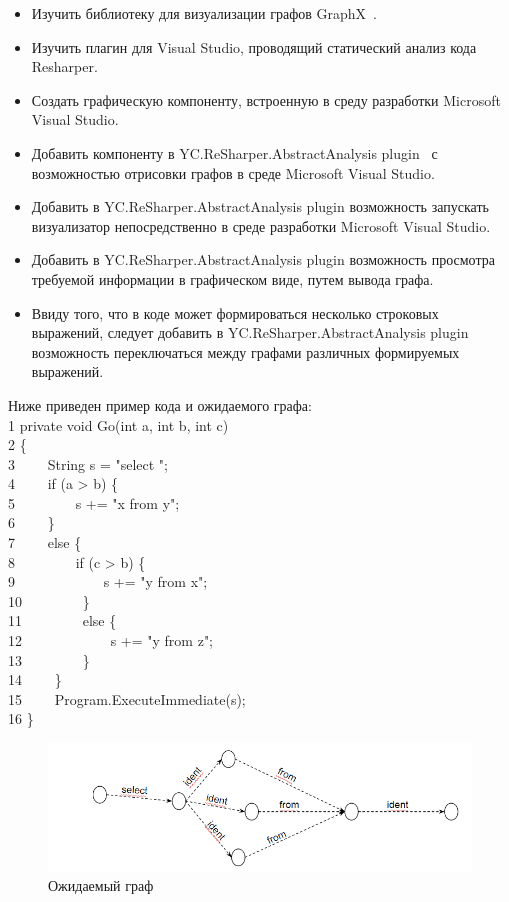 \documentclass{matmex-diploma}
\begin{document}
\begin{itemize}

         \item { Изучить библиотеку для визуализации графов GraphX~\cite{wiki:GraphX}.}
        \item { Изучить плагин для Visual Studio, проводящий статический анализ кода Resharper. }
       \item { Создать графическую компоненту, встроенную в среду разработки Microsoft Visual Studio. }
        \item {Добавить компоненту в YC.ReSharper.AbstractAnalysis plugin~\cite{wiki:Plugin} с возможностью отрисовки графов в среде Microsoft Visual Studio.}
        \item{ Добавить в YC.ReSharper.AbstractAnalysis plugin возможность запускать визуализатор непосредственно в среде разработки Microsoft Visual Studio. }
        \item{ Добавить в YC.ReSharper.AbstractAnalysis plugin возможность просмотра требуемой информации в графическом виде, путем вывода графа. }
        \item { Ввиду того, что в коде может формироваться несколько строковых выражений, следует добавить в YC.ReSharper.AbstractAnalysis plugin возможность переключаться между графами различных формируемых выражений. }
 \end{itemize}
Ниже приведен пример кода и ожидаемого графа:\\
1 private void Go(int a, int b, int c)\\
2 \{\\
3 \ \ \ \ String s = "select ";\\
4 \ \ \ \ if (a > b) \{\\
5 \ \ \ \ \ \ \ \ s += "x from y";\\
6 \ \ \ \ \}\\
7 \ \ \ \ else \{\\
8 \ \ \ \ \ \ \ \ if (c > b) \{\\
9 \ \ \ \ \ \ \ \ \ \ \ \ s += "y from x";\\
10 \ \ \ \ \ \ \ \ \}\\
11 \ \ \ \ \ \ \ \ else \{\\
12 \ \ \ \ \ \ \ \ \ \ \ \ s += "y from z";\\
13 \ \ \ \ \ \ \ \ \}\\
14 \ \ \ \ \}\\
15 \ \ \ \ Program.ExecuteImmediate(s);\\
16 \}

\begin{figure}[h]
\label{CodeVisual}
\centering
\includegraphics[width=\textwidth]{NeedGraph.PNG}
\caption{Ожидаемый граф}
\end{figure}
\end{document}

